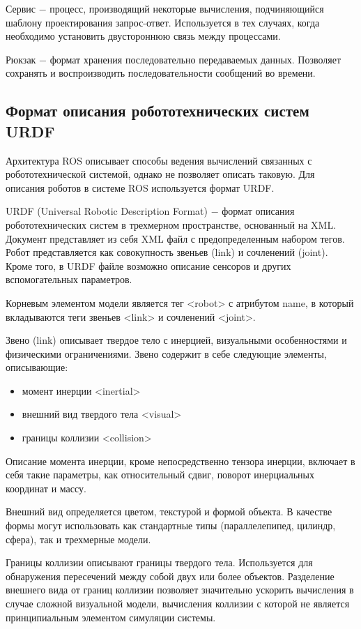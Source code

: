 \documentclass[oneside,final,14pt]{extreport}
\begin{document}
Сервис $-$ процесс, производящий некоторые вычисления, подчиняющийся шаблону проектирования запрос-ответ. Используется в тех случаях, когда необходимо установить двустороннюю связь между процессами. 

Рюкзак $-$ формат хранения последовательно передаваемых данных. Позволяет сохранять и воспроизводить последовательности сообщений во времени.

\subsection{Формат описания робототехнических систем  URDF}
\label{chapt:URDF}
Архитектура ROS описывает способы ведения вычислений связанных с робототехнической системой, однако не позволяет описать таковую. Для описания роботов в системе ROS используется формат URDF.

URDF (Universal Robotic Description Format) $-$ формат описания робототехнических систем в трехмерном пространстве, основанный на XML. Документ представляет из себя XML файл с предопределенным набором тегов. Робот представляется как совокупность звеньев (link) и сочленений (joint). Кроме того, в URDF файле возможно описание сенсоров и других вспомогательных параметров. 

Корневым элементом модели является тег <robot> с атрибутом name, в который вкладываются теги звеньев <link> и сочленений <joint>.

Звено (link) описывает твердое тело с инерцией, визуальными особенностями и физическими ограничениями. Звено содержит в себе следующие элементы, описывающие:

\begin{itemize}
\item момент инерции <inertial>
\item внешний вид твердого тела <visual>
\item границы коллизии <collision>
\end{itemize}

Описание момента инерции, кроме непосредственно тензора инерции, включает в себя такие параметры, как относительный сдвиг, поворот инерциальных координат и массу.

Внешний вид определяется цветом, текстурой и формой объекта. В качестве формы могут использовать как стандартные типы (параллелепипед, цилиндр, сфера), так и трехмерные модели. 

Границы коллизии описывают границы твердого тела. Используется для обнаружения пересечений между собой двух или более объектов. Разделение внешнего вида от границ коллизии позволяет значительно ускорить вычисления в случае сложной визуальной модели, вычисления коллизии с которой не является принципиальным элементом симуляции системы. 
\end{document}
